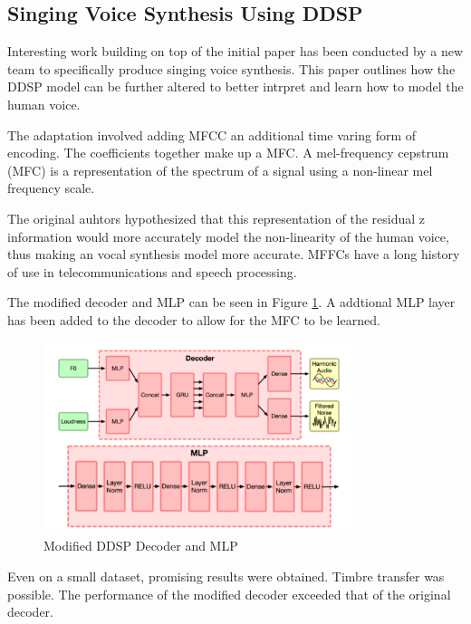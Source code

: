 \subsection{Singing Voice Synthesis Using DDSP}
\label{sec:singing_voice_synthesis}

Interesting work building on top of the initial paper has been conducted by a new team to specifically produce singing voice synthesis\cite{SingingDDSP}. This paper outlines how the DDSP model can be further altered to better intrpret and learn how to model the human voice.

The adaptation involved adding \acrfull{MFCC} an additional time varing form of encoding. The coefficients together make up a \acrfull{MFC}. A mel-frequency cepstrum (MFC) is a representation of the spectrum of a signal using a non-linear mel frequency scale.

The original auhtors hypothesized that this representation of the residual z information would more accurately model the non-linearity of the human voice, thus making an vocal synthesis model more accurate. MFFCs have a long history of use in telecommunications and speech processing\cite{MFCCHistory}.

The modified decoder and MLP can be seen in Figure \ref{fig:singing_decoder_mlp}. A addtional MLP layer has been added to the decoder to allow for the MFC to be learned.

\begin{figure}[!ht]
    \centering
    \includegraphics[width=0.8\textwidth]{literature_review/SingingDecoderMLP.png}
    \caption{Modified DDSP Decoder and MLP\cite{SingingDDSP}}
    \label{fig:singing_decoder_mlp}
\end{figure}

Even on a small dataset, promising results were obtained. Timbre transfer was possible. The performance of the modified decoder exceeded that of the original decoder.

